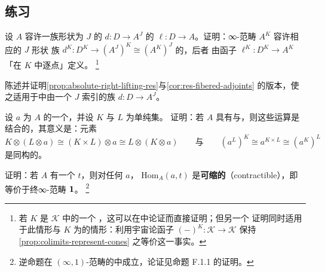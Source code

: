 \subsection*{练习}

\begin{exercise}\label{ex:pointwise-limits}
设 $A$ 容许一族形状为 $J$ 的\trDiagram{} $d\colon D\to A^{J}$ 的\trLimit{}
$\ell\colon D\to A$。证明：\trDiagram{}∞-范畴 $A^{K}$ 容许相应的 $J$ 形状%
\trDiagram{}族 $d^{K}\colon D^{K}\to(A^{J})^{K}\cong(A^{K})^{J}$ 的\trLimit{}，后者
由函子 $\ell^{K}\colon D^{K}\to A^{K}$「在 $K$ 中逐点」定义。%
\footnote{若 $K$ 是\trCartesianClosed{}\trInfinityCosmos{} $\mathcal{K}$ 中的一个%
\trInfinityCategory{}，这可以在\trHomotopyTwoCategory{}中论证而直接证明；但另一个
证明同时适用于此情形与 $K$ 为\trSimplicialSet{}的情形：利用宇宙论函子
$(-)^{K}\colon\mathcal{K}\to\mathcal{K}$ 保持\cref{prop:colimits-represent-cones}
之等价这一事实。}
\end{exercise}

\begin{exercise}\label{ex:j-indexed-versions}
陈述并证明\cref{prop:absolute-right-lifting-res}与\cref{cor:res-fibered-adjoints}
的版本，使之适用于\trCartesianClosed{}\trInfinityCosmos{}中由一个%
\trInfinityCategory{} $J$ 索引的\trDiagram{}族 $d\colon D\to A^{J}$。
\end{exercise}

\begin{exercise}\label{ex:tensor-associativity}
设 $a$ 为\trInfinityCategory{} $A$ 的一个\trElement{}，并设 $K$ 与 $L$ 为单纯集。
证明：若 $A$ 具有\trTensor{}与\trCotensor{}，则这些运算是结合的，其意义是：元素
\begin{equation*}
K\otimes(L\otimes a)\cong(K\times L)\otimes a\cong L\otimes(K\otimes a)
\qquad\text{与}\qquad
(a^{L})^{K}\cong a^{K\times L}\cong(a^{K})^{L}
\end{equation*}
是同构的。
\end{exercise}

\begin{exercise}\label{ex:mapping-space-contractible}
证明：若 $A$ 有一个\trTerminal{}\trElement{} $t$，则对任何\trElement{} $a$，
\trMappingSpace{} $\mathrm{Hom}_{A}(a,t)$ 是\textbf{可缩的}（contractible），即
等价于终∞-范畴 $\mathbf{1}$。%
\footnote{逆命题在 $(\infty,1)$-范畴的\trInfinityCosmos{}中成立，论证见命题
F.1.1 的证明。}
\end{exercise}


